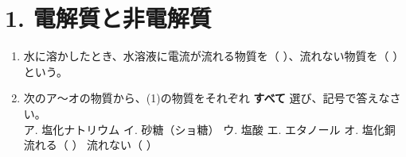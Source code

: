 \section*{1. 電解質と非電解質}
\begin{enumerate}
    \item 水に溶かしたとき、水溶液に電流が流れる物質を（ \hspace{4cm} ）、流れない物質を（ \hspace{4cm} ）という。
    \item 次のア～オの物質から、(1)の物質をそれぞれ \textbf{すべて} 選び、記号で答えなさい。\\[0.2cm]
    ア. 塩化ナトリウム \hspace{0.5cm} イ. 砂糖（ショ糖） \hspace{0.5cm} ウ. 塩酸 \hspace{0.5cm} エ. エタノール \hspace{0.5cm} オ. 塩化銅\\[0.2cm]
    流れる（ \hspace{4.5cm} ） \hspace{1cm} 流れない（ \hspace{4.5cm} ）
\end{enumerate}

